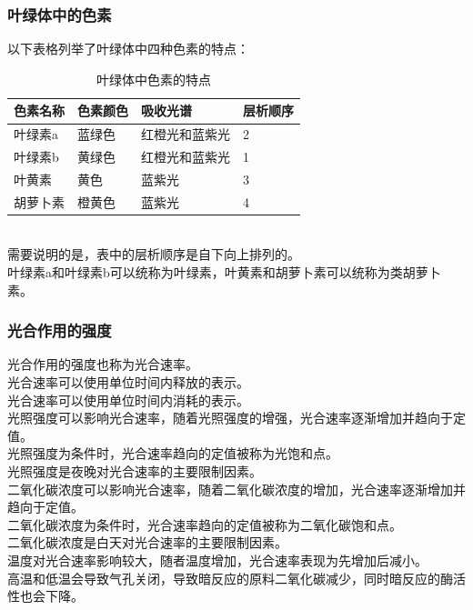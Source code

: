 \documentclass[UTF8]{ctexart}
\begin{document}
\newpage

\subsubsection{叶绿体中的色素}
    以下表格列举了叶绿体中四种色素的特点：\vspace{8pt}
    \begin{table}[h]
        \begin{center}
            \begin{tabular}{l|l|l|l}
                \hline
                色素名称\qquad\qquad&色素颜色\qquad\qquad&吸收光谱\qquad\qquad\qquad&层析顺序\qquad\qquad\\ \hline
                叶绿素a&蓝绿色&红橙光和蓝紫光&2\\ \hline
                叶绿素b&黄绿色&红橙光和蓝紫光&1\\ \hline
                叶黄素&黄色&蓝紫光&3\\ \hline
                胡萝卜素&橙黄色&蓝紫光&4\\ \hline
            \end{tabular}
            \caption{叶绿体中色素的特点}
        \end{center}
    \end{table}\\
    需要说明的是，表中的层析顺序是自下向上排列的。\\[3mm]
    叶绿素a和叶绿素b可以统称为叶绿素，叶黄素和胡萝卜素可以统称为类胡萝卜素。\\

\subsubsection{光合作用的强度}
    光合作用的强度也称为光合速率。\\[3mm]
    光合速率可以使用单位时间内释放的表示。\\[3mm]
    光合速率可以使用单位时间内消耗的表示。\\[6mm]
    光照强度可以影响光合速率，随着光照强度的增强，光合速率逐渐增加并趋向于定值。\\[3mm]
    光照强度为条件时，光合速率趋向的定值被称为光饱和点。\\[3mm]
    光照强度是夜晚对光合速率的主要限制因素。\\[6mm]
    二氧化碳浓度可以影响光合速率，随着二氧化碳浓度的增加，光合速率逐渐增加并趋向于定值。\\[3mm]
    二氧化碳浓度为条件时，光合速率趋向的定值被称为二氧化碳饱和点。\\[3mm]
    二氧化碳浓度是白天对光合速率的主要限制因素。\\[6mm]
    温度对光合速率影响较大，随者温度增加，光合速率表现为先增加后减小。\\[3mm]
    高温和低温会导致气孔关闭，导致暗反应的原料二氧化碳减少，同时暗反应的酶活性也会下降。
\end{document}
